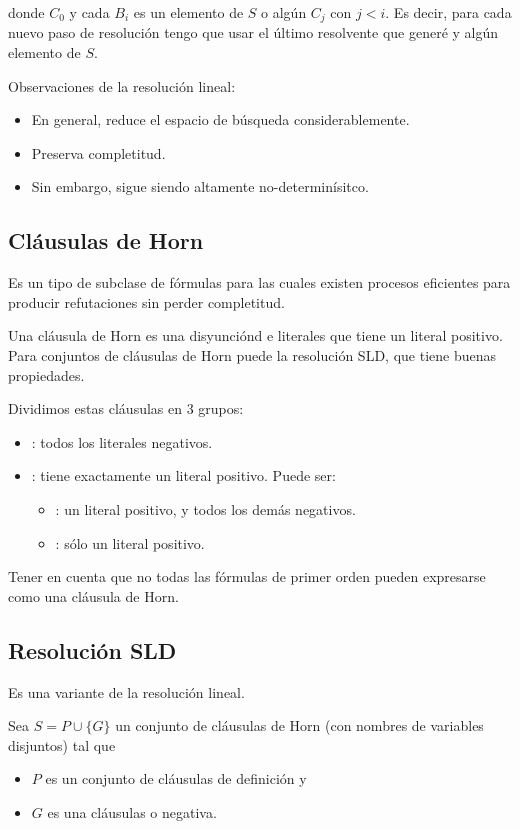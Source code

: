 donde $C_0$ y cada $B_i$ es un elemento de $S$ o algún $C_j$ con $j < i$. Es decir, para cada nuevo paso de resolución tengo que usar el último resolvente que generé y algún elemento de $S$.

Observaciones de la resolución lineal:
\begin{itemize}
  \item En general, reduce el espacio de búsqueda considerablemente.
  \item Preserva completitud.
  \item Sin embargo, sigue siendo altamente no-determinísitco.
\end{itemize}

\subsection{Cláusulas de Horn}

Es un tipo de subclase de fórmulas para las cuales existen procesos eficientes para producir refutaciones sin perder completitud.

Una cláusula de Horn es una disyunciónd e literales que tiene  un literal positivo. Para conjuntos de cláusulas de Horn puede la resolución SLD, que tiene buenas propiedades.

Dividimos estas cláusulas en 3 grupos:
\begin{itemize}
  \item {}: todos los literales negativos.
  \item {}: tiene exactamente un literal positivo. Puede ser:
    \begin{itemize}
      \item {}: un literal positivo, y todos los demás negativos.
      \item {}: sólo un literal positivo.
    \end{itemize}
\end{itemize}

Tener en cuenta que no todas las fórmulas de primer orden pueden expresarse como una cláusula de Horn.

\subsection{Resolución SLD}

Es una variante de la resolución lineal.

Sea $S = P \cup \{G\}$ un conjunto de cláusulas de Horn (con nombres de variables disjuntos) tal que
\begin{itemize}
  \item $P$ es un conjunto de cláusulas de definición y
  \item $G$ es una cláusulas  o negativa.
\end{itemize}

